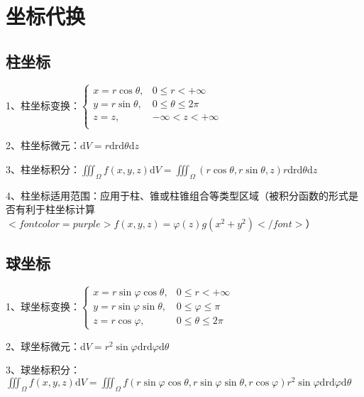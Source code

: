 \section{坐标代换}



\subsection{柱坐标}

1、柱坐标变换：$ \begin{cases} x=r \cos \theta, & 0 \leqslant r < +\infty \\ y=r \sin \theta,& 0 \leqslant \theta \leqslant 2 \pi \\ z=z, &  -\infty<z<+\infty \\ \end{cases} $

2、柱坐标微元：$ \mathrm{d} V=r \mathrm{drd} \theta \mathrm{d} z $

3、柱坐标积分：$ \iiint_{\Omega} f(x, y, z) \mathrm{d} V=\iiint_{\Omega}(r \cos \theta, r \sin \theta, z) r \mathrm{drd} \theta \mathrm{d} z $

4、柱坐标适用范围：应用于柱、锥或柱锥组合等类型区域（被积分函数的形式是否有利于柱坐标计算$ <font color=purple>f(x, y, z)=\varphi(z) g\left(x^{2}+y^{2}\right)</font> $）



\subsection{球坐标}

1、球坐标变换：$ \begin{cases}x=r \sin \varphi \cos \theta, & 0 \leqslant r<+\infty \\ y=r \sin \varphi \sin \theta, & 0 \leqslant \varphi \leqslant \pi \\ z=r \cos \varphi, & 0 \leqslant \theta \leqslant 2 \pi\end{cases} $

2、球坐标微元：$ \mathrm{d} V=r^{2} \sin \varphi \mathrm{drd} \varphi \mathrm{d} \theta $

3、球坐标积分：$ \iiint_{\Omega} f(x, y, z) \mathrm{d} V=\iiint_{\Omega} f(r \sin \varphi \cos \theta, r \sin \varphi \sin \theta, r \cos \varphi) r^{2} \sin \varphi \mathrm{drd} \varphi \mathrm{d} \theta $

